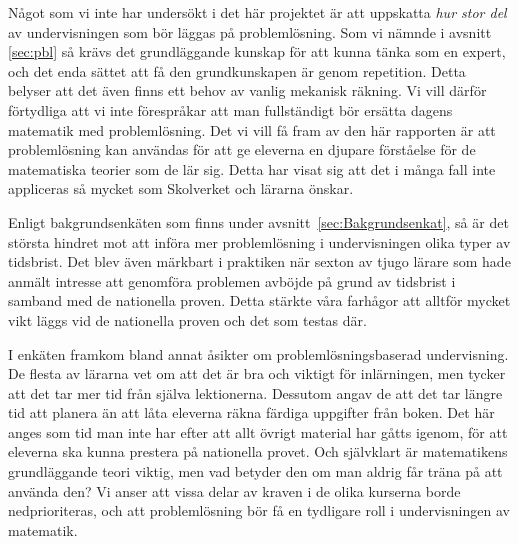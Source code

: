 
\textcolor{Mahogany}{Något som vi inte har undersökt i det här projektet är att uppskatta \textsl{hur stor del} av undervisningen som bör läggas på problemlösning.} \textcolor{turkos}{Som vi nämnde i avsnitt \ref{sec:pbl} så krävs det grundläggande kunskap för att kunna tänka som en expert, och det enda sättet att få den grundkunskapen är genom repetition. }\textcolor{Mahogany}{Detta belyser att det även finns ett behov av vanlig mekanisk räkning. Vi vill därför förtydliga att vi inte förespråkar att man fullständigt bör ersätta dagens matematik med problemlösning. Det vi vill få fram av den här rapporten är att problemlösning kan användas för att ge eleverna en djupare förståelse för de matematiska teorier som de lär sig. Detta har visat sig att det i många fall inte appliceras så mycket som Skolverket och lärarna önskar.}

\textcolor{lila}{Enligt bakgrundsenkäten som finns under avsnitt~\ref{sec:Bakgrundsenkat}, så är det största hindret mot att införa mer problemlösning i undervisningen olika typer av tidsbrist. Det blev även märkbart i praktiken när sexton av tjugo lärare som hade anmält intresse att genomföra problemen avböjde på grund av tidsbrist i samband med de nationella proven. Detta stärkte våra farhågor att alltför mycket vikt läggs vid de nationella proven och det som testas där.}


\textcolor{lila}{I enkäten framkom bland annat åsikter om problemlösningsbaserad undervisning. De flesta av lärarna vet om att det är bra och viktigt för inlärningen, men tycker att det tar mer tid från själva lektionerna. Dessutom angav de att det tar längre tid att planera än att låta eleverna räkna färdiga uppgifter från boken. Det här anges som tid man inte har efter att allt övrigt material har gåtts igenom, för att eleverna ska kunna prestera på nationella provet. Och självklart är matematikens grundläggande teori viktig, men vad betyder den om man aldrig får träna på att använda den? Vi anser att vissa delar av kraven i de olika kurserna borde nedprioriteras, och att problemlösning bör få en tydligare roll i undervisningen av matematik.} 

